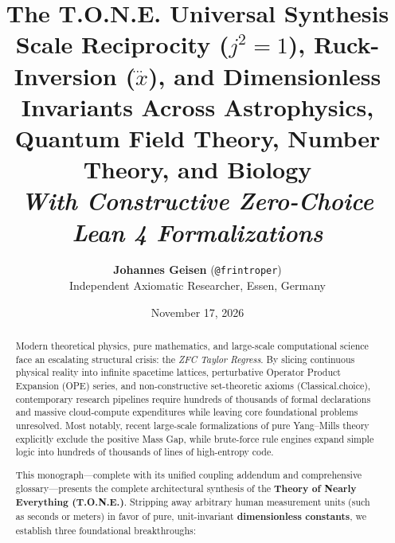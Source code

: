 \documentclass[11pt,a4paper,oneside]{article}
\title{\textbf{\Huge The T.O.N.E. Universal Synthesis}\\[0.4em]
\Large Scale Reciprocity ($j^2 = 1$), Ruck-Inversion ($\dddot{x}$), and Dimensionless Invariants Across Astrophysics, Quantum Field Theory, Number Theory, and Biology\\[0.4em]
\normalsize \textit{With Constructive Zero-Choice Lean 4 Formalizations}}
\author{\textbf{Johannes Geisen} (\texttt{@frintroper})\\
\small Independent Axiomatic Researcher, Essen, Germany}
\date{November 17, 2026}
\def\texttt#1{#1}%
\theoremstyle{definition}
\begin{document}
\maketitle

\begin{abstract}
\noindent Modern theoretical physics, pure mathematics, and large-scale computational science face an escalating structural crisis: the \textit{ZFC Taylor Regress}. By slicing continuous physical reality into infinite spacetime lattices, perturbative Operator Product Expansion (OPE) series, and non-constructive set-theoretic axioms (\texttt{Classical.choice}), contemporary research pipelines require hundreds of thousands of formal declarations and massive cloud-compute expenditures while leaving core foundational problems unresolved. Most notably, recent large-scale formalizations of pure Yang--Mills theory explicitly exclude the positive Mass Gap, while brute-force rule engines expand simple logic into hundreds of thousands of lines of high-entropy code.

This monograph—complete with its unified coupling addendum and comprehensive glossary—presents the complete architectural synthesis of the \textbf{Theory of Nearly Everything (T.O.N.E.)}. Stripping away arbitrary human measurement units (such as seconds or meters) in favor of pure, unit-invariant \textbf{dimensionless constants}, we establish three foundational breakthroughs:


\end{abstract}
\end{document}
